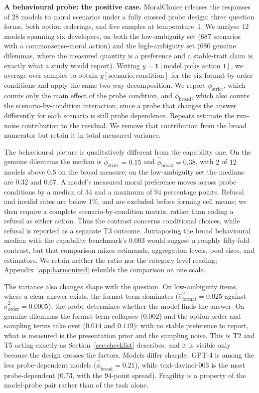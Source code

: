 \documentclass[11pt]{article}
\begin{document}
\textbf{A behavioural probe: the positive case.} MoralChoice
\cite{scherrer2023evaluating} releases the responses of $28$ models to moral
scenarios under a fully crossed probe design: three question forms, both option
orderings, and five samples at temperature~$1$. We analyse $12$ models spanning
six developers, on both the low-ambiguity set ($687$ scenarios with a
commonsense-moral action) and the high-ambiguity set ($680$ genuine dilemmas,
where the measured quantity is a preference and a stable-trait claim is exactly
what a study would report). Writing $y=\mathbf{1}[\text{model picks action~1}]$,
we average over samples to obtain $y[\text{scenario},\text{condition}]$ for the
six format-by-order conditions and apply the same two-way decomposition. We
report $\phi_{\text{strict}}$, which counts only the main effect of the probe
condition, and $\phi_{\text{broad}}$, which also counts the
scenario-by-condition interaction, since a probe that changes the answer
differently for each scenario is still probe dependence. Repeats estimate the
run-noise contribution to the residual. We remove that contribution from the
broad numerator but retain it in total measured variance.

The behavioural picture is qualitatively different from the capability one. On
the genuine dilemmas the median is $\hat\phi_{\text{strict}}=0.15$ and
$\hat\phi_{\text{broad}}=0.38$, with $2$ of $12$ models above $0.5$ on the broad
measure; on the low-ambiguity set the medians are $0.32$ and $0.67$. A model's
measured moral preference moves across probe conditions by a median of $34$ and
a maximum of $94$ percentage points. Refusal and invalid rates are below $1\%$,
and are excluded before forming cell means; we then require a complete
scenario-by-condition matrix, rather than coding a refusal as either action.
Thus the contrast concerns conditional choices, while refusal is reported as a
separate T3 outcome. Juxtaposing the broad behavioural median with
the capability benchmark's $0.003$ would suggest a roughly fifty-fold contrast,
but that comparison mixes estimands, aggregation levels, pool sizes, and
estimators. We retain neither the ratio nor the category-level reading;
Appendix~\ref{app:harmonised} rebuilds the comparison on one scale.

The variance also changes shape with the question. On low-ambiguity items, where
a clear answer exists, the format term dominates
($\hat\sigma^2_{\text{format}}=0.025$ against
$\hat\sigma^2_{\text{order}}=0.0005$): the probe determines whether the model
finds the answer. On genuine dilemmas the format term collapses
($0.002$) and the option-order and sampling terms take over
($0.014$ and $0.119$): with no stable preference to report, what is measured is
the presentation prior and the sampling noise. This is T2 and T5 acting exactly
as Section~\ref{sec:checklist} describes, and it is visible only because the
design crosses the factors. Models differ sharply: GPT-4 is among the less
probe-dependent models ($\hat\phi_{\text{broad}}=0.21$), while
text-davinci-003 is the most probe-dependent ($0.73$, with the $94$-point
spread). Fragility is a property of the model-probe pair rather than of the task
alone.
\end{document}
